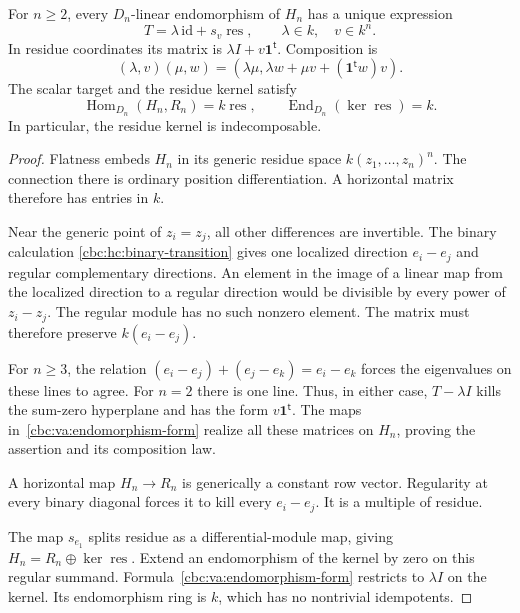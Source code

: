 \begin{theorem}\label{cbc:va:primitive-endomorphisms}
For $n\geq2$, every $D_n$-linear endomorphism of $H_n$
has a unique expression
\begin{equation}\label{cbc:va:endomorphism-form}
 T=\lambda\,\mathrm{id}+s_v\operatorname{res},
 \qquad \lambda\in k,\quad v\in k^n.
\end{equation}
In residue coordinates its matrix is
$\lambda I+v\mathbf1^{\mathsf t}$. Composition is
\[
 (\lambda,v)(\mu,w)
  =(\lambda\mu,\lambda w+\mu v+
                       (\mathbf1^{\mathsf t}w)v).
\]
The scalar target and the residue kernel satisfy
\[
 \operatorname{Hom}_{D_n}(H_n,R_n)=k\operatorname{res},
 \qquad \operatorname{End}_{D_n}(\ker\operatorname{res})=k.
\]
In particular, the residue kernel is indecomposable.
\end{theorem}
\begin{proof}
Flatness embeds $H_n$ in its generic residue space
$k(z_1,\ldots,z_n)^n$. The connection there is ordinary
position differentiation. A horizontal matrix therefore
has entries in $k$.

Near the generic point of $z_i=z_j$, all other differences
are invertible. The binary calculation
\eqref{cbc:hc:binary-transition} gives one localized
direction $e_i-e_j$ and regular complementary directions.
An element in the image of a linear map from the localized
direction to a regular direction would be divisible by
every power of $z_i-z_j$. The regular module has no such
nonzero element. The matrix must therefore preserve
$k(e_i-e_j)$.

For $n\geq3$, the relation
$(e_i-e_j)+(e_j-e_k)=e_i-e_k$ forces the eigenvalues on
these lines to agree. For $n=2$ there is one line.
Thus, in either case, $T-\lambda I$ kills the sum-zero
hyperplane and has the form $v\mathbf1^{\mathsf t}$.
The maps in~\eqref{cbc:va:endomorphism-form} realize all
these matrices on $H_n$, proving the assertion and its
composition law.

A horizontal map $H_n\to R_n$ is generically a constant
row vector. Regularity at every binary diagonal forces
it to kill every $e_i-e_j$. It is a multiple of residue.

The map $s_{e_1}$ splits residue as a differential-module
map, giving $H_n=R_n\oplus\ker\operatorname{res}$.
Extend an endomorphism of the kernel by zero on this
regular summand. Formula~\eqref{cbc:va:endomorphism-form}
restricts to $\lambda I$ on the kernel. Its endomorphism
ring is $k$, which has no nontrivial idempotents.
\end{proof}


